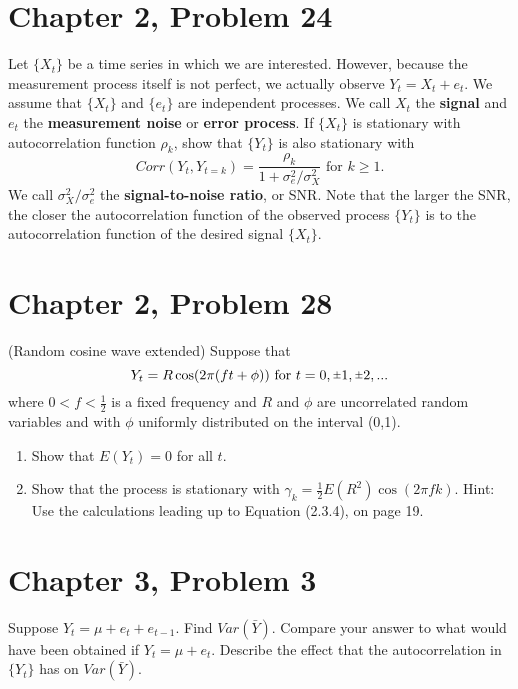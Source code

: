 \documentclass[11pt]{article}
\newif\ifclearpage
\newcommand{\rpm}{\sbox0{$1$}\sbox2{$\scriptstyle\pm$}
  \raise\dimexpr(\ht0-\ht2)/2\relax\box2 }
\newcommand{\problem}[1]{\section*{#1}}
\newcommand{\solution}{\hrulefill}
\newcommand{\maybeclearpage}{\ifclearpage\clearpage\fi}
\begin{document}
\problem{Chapter 2, Problem 24}
Let $\{X_t\}$ be a time series in which we are interested. However, because the measurement process itself is not perfect, we actually observe $Y_t = X_t + e_t$. We assume that $\{X_t\}$ and $\{e_t\}$ are independent processes. We call $X_t$ the \textbf{signal} and $e_t$ the \textbf{measurement noise} or \textbf{error process}. \newline
If $\{X_t\}$ is stationary with autocorrelation function $\rho_k$, show that $\{Y_t\}$ is also stationary with $$Corr(Y_t,Y_{t=k}) = \frac{\rho_k}{1 + \sigma_e^2/\sigma_X^2} \text{ for } k \geq 1.$$
We call $\sigma_X^2 / \sigma_e^2$ the \textbf{signal-to-noise ratio}, or SNR. Note that the larger the SNR, the closer the autocorrelation function of the observed process $\{Y_t\}$ is to the autocorrelation function of the desired signal $\{X_t\}$. 

\solution


\maybeclearpage
\problem{Chapter 2, Problem 28}
(Random cosine wave extended) Suppose that $$Y_t = R\cos(2 \pi(ft + \phi)) \text{ for } t = 0, \rpm 1, \rpm 2, ...$$
where $0 < f < \frac{1}{2}$ is a fixed frequency and $R$ and $\phi$ are uncorrelated random variables and with $\phi$ uniformly distributed on the interval (0,1).
\begin{enumerate}
	\item Show that $E(Y_t) = 0$ for all $t$.
	\item Show that the process is stationary with $\gamma_k = \frac{1}{2}E(R^2)\cos(2 \pi fk)$. \newline Hint: Use the calculations leading up to Equation (2.3.4), on page 19.
\end{enumerate}

\solution



\maybeclearpage
\problem{Chapter 3, Problem 3}
Suppose $Y_t = \mu + e_t + e_{t-1}$. Find $Var(\bar{Y})$. Compare your answer to what would have been obtained if $Y_t = \mu + e_t$. Describe the effect that the autocorrelation in $\{Y_t\}$ has on $Var(\bar{Y})$.

\solution
\end{document}

